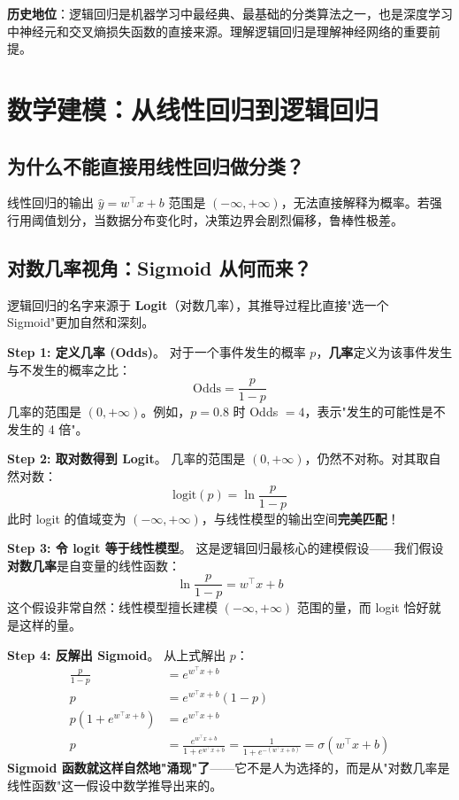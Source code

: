 \documentclass[12pt, a4paper]{book}
\begin{document}
\textbf{历史地位}：逻辑回归是机器学习中最经典、最基础的分类算法之一，也是深度学习中神经元和交叉熵损失函数的直接来源。理解逻辑回归是理解神经网络的重要前提。

\section{数学建模：从线性回归到逻辑回归}

\subsection{为什么不能直接用线性回归做分类？}
线性回归的输出 $\hat{y} = w^\top x + b$ 范围是 $(-\infty, +\infty)$，无法直接解释为概率。若强行用阈值划分，当数据分布变化时，决策边界会剧烈偏移，鲁棒性极差。

\subsection{对数几率视角：Sigmoid 从何而来？}
逻辑回归的名字来源于 \textbf{Logit}（对数几率），其推导过程比直接"选一个 Sigmoid"更加自然和深刻。

\textbf{Step 1: 定义几率 (Odds)}。
对于一个事件发生的概率 $p$，\textbf{几率}定义为该事件发生与不发生的概率之比：
$$ \text{Odds} = \frac{p}{1 - p} $$
几率的范围是 $(0, +\infty)$。例如，$p=0.8$ 时 Odds $= 4$，表示"发生的可能性是不发生的 4 倍"。

\textbf{Step 2: 取对数得到 Logit}。
几率的范围是 $(0, +\infty)$，仍然不对称。对其取自然对数：
$$ \text{logit}(p) = \ln \frac{p}{1 - p} $$
此时 logit 的值域变为 $(-\infty, +\infty)$，与线性模型的输出空间\textbf{完美匹配}！

\textbf{Step 3: 令 logit 等于线性模型}。
这是逻辑回归最核心的建模假设——我们假设\textbf{对数几率}是自变量的线性函数：
$$ \ln \frac{p}{1-p} = w^\top x + b $$
这个假设非常自然：线性模型擅长建模 $(-\infty, +\infty)$ 范围的量，而 logit 恰好就是这样的量。

\textbf{Step 4: 反解出 Sigmoid}。
从上式解出 $p$：
\begin{align}
\frac{p}{1-p} &= e^{w^\top x + b} \\
p &= e^{w^\top x + b} (1-p) \\
p (1 + e^{w^\top x + b}) &= e^{w^\top x + b} \\
p &= \frac{e^{w^\top x + b}}{1 + e^{w^\top x + b}} = \frac{1}{1 + e^{-(w^\top x + b)}} = \sigma(w^\top x + b)
\end{align}
\textbf{Sigmoid 函数就这样自然地"涌现"了}——它不是人为选择的，而是从"对数几率是线性函数"这一假设中数学推导出来的。
\end{document}
